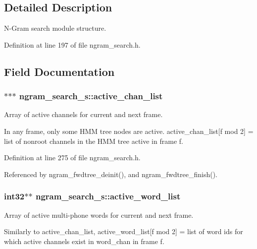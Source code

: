 \subsection{Detailed Description}
N-\/\-Gram search module structure. 

Definition at line 197 of file ngram\-\_\-search.\-h.



\subsection{Field Documentation}
\subsubsection[{active\-\_\-chan\-\_\-list}]{$\ast$$\ast$$\ast$ ngram\-\_\-search\-\_\-s\-::active\-\_\-chan\-\_\-list}\label{structngram__search__s_a83731bf0e2234e632c5e78f2321f5b2d}


Array of active channels for current and next frame. 

In any frame, only some H\-M\-M tree nodes are active. active\-\_\-chan\-\_\-list[f mod 2] = list of nonroot channels in the H\-M\-M tree active in frame f. 

Definition at line 275 of file ngram\-\_\-search.\-h.



Referenced by ngram\-\_\-fwdtree\-\_\-deinit(), and ngram\-\_\-fwdtree\-\_\-finish().

\subsubsection[{active\-\_\-word\-\_\-list}]{\setlength{\rightskip}{0pt plus 5cm}int32$\ast$$\ast$ ngram\-\_\-search\-\_\-s\-::active\-\_\-word\-\_\-list}\label{structngram__search__s_a5056573bf95990cc28c97a56cd76ce9a}


Array of active multi-\/phone words for current and next frame. 

Similarly to active\-\_\-chan\-\_\-list, active\-\_\-word\-\_\-list[f mod 2] = list of word ids for which active channels exist in word\-\_\-chan in frame f.

